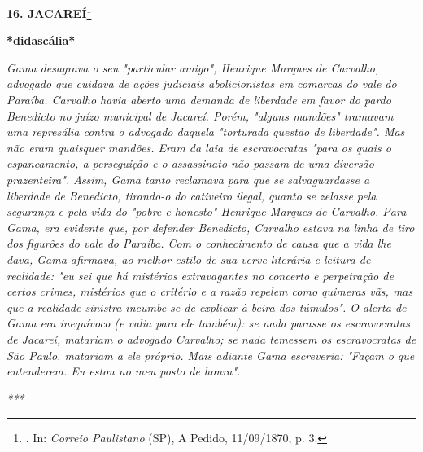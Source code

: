 \textbf{16. JACAREÍ}\footnote{. In: \emph{Correio Paulistano} (SP), A
  Pedido, 11/09/1870, p. 3.}

\textbf{*didascália*}

\emph{Gama desagrava o seu "particular amigo", Henrique Marques de
Carvalho, advogado que cuidava de ações judiciais abolicionistas em
comarcas do vale do Paraíba. Carvalho havia aberto uma demanda de
liberdade em favor do pardo Benedicto no juízo municipal de Jacareí.
Porém, "alguns mandões" tramavam uma represália contra o advogado
daquela "torturada questão de liberdade". Mas não eram quaisquer
mandões. Eram da laia de escravocratas "para os quais o espancamento, a
perseguição e o assassinato não passam de uma diversão prazenteira".
Assim, Gama tanto reclamava para que se salvaguardasse a liberdade de
Benedicto, tirando-o do cativeiro ilegal, quanto se zelasse pela
segurança e pela vida do "pobre e honesto" Henrique Marques de Carvalho.
Para Gama, era evidente que, por defender Benedicto, Carvalho estava na
linha de tiro dos figurões do vale do Paraíba. Com o conhecimento de
causa que a vida lhe dava, Gama afirmava, ao melhor estilo de sua verve
literária e leitura de realidade: "eu sei que há mistérios extravagantes
no concerto e perpetração de certos crimes, mistérios que o critério e a
razão repelem como quimeras vãs, mas que a realidade sinistra incumbe-se
de explicar à beira dos túmulos". O alerta de Gama era inequívoco (e
valia para ele também): se nada parasse os escravocratas de Jacareí,
matariam o advogado Carvalho; se nada temessem os escravocratas de São
Paulo, matariam a ele próprio. Mais adiante Gama escreveria: "Façam o
que entenderem. Eu estou no meu posto de honra".}

\emph{***}

